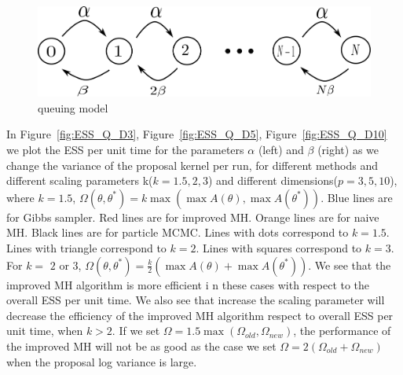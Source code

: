   \begin{figure}
  \centering
  \begin{minipage}[hp]{0.6\linewidth}%
  \centering
    \includegraphics [width=1\textwidth, angle=0]{figs/queue_model.pdf}%
      \end{minipage}
    \caption{queuing model}
	\label{q_model}
  \end{figure}
  In Figure~\ref{fig:ESS_Q_D3}, Figure~\ref{fig:ESS_Q_D5}, Figure~\ref{fig:ESS_Q_D10} we plot the ESS per unit time for the parameters $\alpha$ (left) and $\beta$ (right) as we change the variance of the
  proposal kernel per run, for different methods and different scaling parameters k($k = 1.5, 2, 3$) and different dimensions($p = 3, 5, 10$), where   $k = 1.5$,  $\Omega(\theta, \theta^*) = k \max(\max A(\theta), \max A(\theta^*))$. Blue lines are for Gibbs sampler. Red lines are for improved MH. Orange lines are for naive MH. Black lines are for particle MCMC. Lines with dots correspond to $k = 1.5$. Lines with triangle correspond to $k = 2$. Lines with squares correspond to $k = 3$. For $k=$ $2$ or $3$, $\Omega(\theta, \theta^*) = \frac{k}{2} (\max A(\theta) + \max A(\theta^*))$. We see that the improved MH algorithm is more efficient i	n these cases with respect to the overall ESS per unit time. We also see that increase the scaling parameter will decrease the efficiency of the improved MH algorithm respect to overall ESS per unit time, when $k > 2$. If we set $\Omega = 1.5 \max(\Omega_{old}, \Omega_{new})$, the performance of the improved MH will not be as good as the case we set $\Omega = 2(\Omega_{old} + \Omega_{new})$ when the proposal log variance is large.\\

